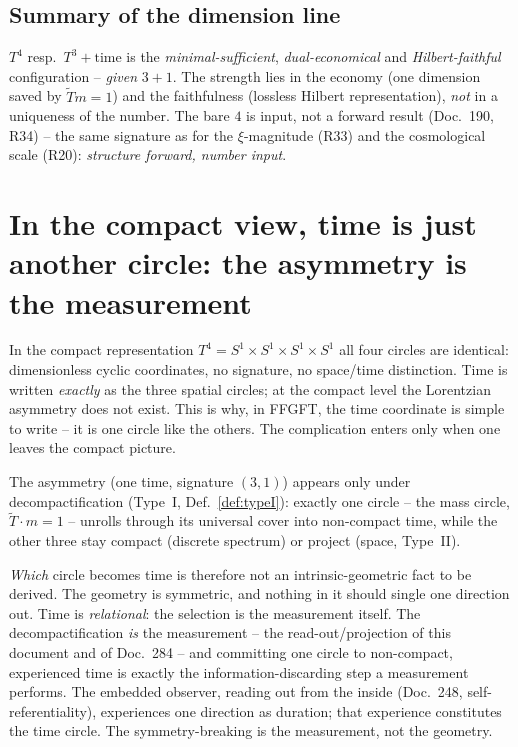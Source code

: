 \subsection{Summary of the dimension line}

\begin{important}
$T^4$ resp.\ $T^3+\text{time}$ is the \emph{minimal-sufficient},
\emph{dual-economical} and \emph{Hilbert-faithful} configuration -- \emph{given}
$3+1$. The strength lies in the economy (one dimension saved by
$\tilde T m=1$) and the faithfulness (lossless Hilbert representation), \emph{not}
in a uniqueness of the number. The bare $4$ is input, not a forward result
(Doc.~190, R34) -- the same signature as for the $\xi$-magnitude (R33) and the
cosmological scale (R20): \emph{structure forward, number input}.
\end{important}

\section{In the compact view, time is just another circle: the asymmetry is the measurement}\label{sec:zeitkreis}

In the compact representation $T^4 = S^1\times S^1\times S^1\times S^1$ all four
circles are identical: dimensionless cyclic coordinates, no signature, no
space/time distinction. Time is written \emph{exactly} as the three spatial
circles; at the compact level the Lorentzian asymmetry does not exist. This is why,
in FFGFT, the time coordinate is simple to write -- it is one circle like the
others. The complication enters only when one leaves the compact picture.

The asymmetry (one time, signature $(3,1)$) appears only under decompactification
(Type~I, Def.~\ref{def:typeI}): exactly one circle -- the mass circle,
$\tilde{T}\cdot m=1$ -- unrolls through its universal cover into non-compact time,
while the other three stay compact (discrete spectrum) or project (space, Type~II).

\emph{Which} circle becomes time is therefore not an intrinsic-geometric fact to be
derived. The geometry is symmetric, and nothing in it should single one direction
out. Time is \emph{relational}: the selection is the measurement itself. The
decompactification \emph{is} the measurement -- the read-out/projection of this
document and of Doc.~284 -- and committing one circle to non-compact, experienced
time is exactly the information-discarding step a measurement performs. The embedded
observer, reading out from the inside (Doc.~248, self-referentiality), experiences
one direction as duration; that experience constitutes the time circle. The
symmetry-breaking is the measurement, not the geometry.

